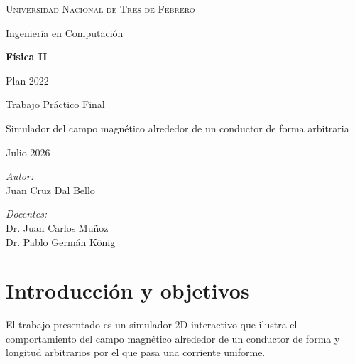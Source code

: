 \documentclass[12pt,a4paper]{article}
\begin{document}
\begin{titlepage}
    \centering
    \vspace*{1.5cm}
    
    {\scshape\LARGE Universidad Nacional de Tres de Febrero \par}
    \vspace{0.5cm}
    {\large Ingeniería en Computación \par}
    
    \vspace{2.5cm}
    
    {\huge \textbf{Física II} \par}
    \vspace{0.5cm}
    {\Large Plan 2022\par}
    
    \vspace{2cm}
    {\Large Trabajo Práctico Final \par}
    {\Large Simulador del campo magnético alrededor de un conductor de forma arbitraria \par}
    \vspace{0.5cm}
    {\large Julio 2026\par}
    
    \vspace{3.5cm}
    
    \begin{minipage}{0.45\textwidth}
        \begin{flushleft} \large
            \emph{Autor:}\\
            Juan Cruz Dal Bello
        \end{flushleft}
    \end{minipage}
    \hfill
    \begin{minipage}{0.45\textwidth}
        \begin{flushright} \large
            \emph{Docentes:} \\
            Dr. Juan Carlos Muñoz \\
            Dr. Pablo Germán König
        \end{flushright}
    \end{minipage}
    
    \vfill
\end{titlepage}

\clearpage

\tableofcontents

\newpage

\section{Introducción y objetivos}
El trabajo presentado es un simulador 2D interactivo que ilustra el comportamiento del campo magnético alrededor de un conductor de forma y longitud arbitrarios por el que pasa una corriente uniforme.
\end{document}
